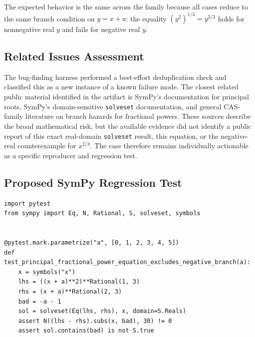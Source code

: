 \documentclass[11pt]{article}
\begin{document}
The expected behavior is the same across the family because all cases reduce to the same branch condition on \(y=x+a\): the equality \((y^2)^{1/3}=y^{2/3}\) holds for nonnegative real \(y\) and fails for negative real \(y\).

\subsection{Related Issues Assessment}

The bug-finding harness performed a best-effort deduplication check and classified this as a new instance of a known failure mode.  The closest related public material identified in the artifact is SymPy's documentation for principal roots, SymPy's domain-sensitive \texttt{solveset} documentation, and general CAS-family literature on branch hazards for fractional powers.  These sources describe the broad mathematical risk, but the available evidence did not identify a public report of this exact real-domain \texttt{solveset} result, this equation, or the negative-real counterexample for \(x^{2/3}\).  The case therefore remains individually actionable as a specific reproducer and regression test.

\subsection{Proposed SymPy Regression Test}

\medskip

\begin{lstlisting}[style=bugpython]
import pytest
from sympy import Eq, N, Rational, S, solveset, symbols


@pytest.mark.parametrize("a", [0, 1, 2, 3, 4, 5])
def test_principal_fractional_power_equation_excludes_negative_branch(a):
    x = symbols("x")
    lhs = ((x + a)**2)**Rational(1, 3)
    rhs = (x + a)**Rational(2, 3)
    bad = -a - 1
    sol = solveset(Eq(lhs, rhs), x, domain=S.Reals)
    assert N((lhs - rhs).subs(x, bad), 30) != 0
    assert sol.contains(bad) is not S.true
\end{lstlisting}
\end{document}
